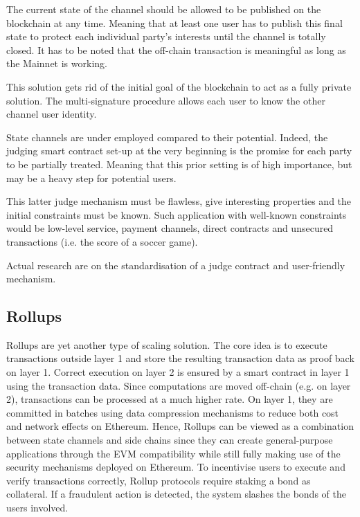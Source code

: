 The current state of the channel should be allowed to be published on the blockchain at any time. Meaning that at least one user has to publish this final state to protect each individual party's interests until the channel is totally closed. It has to be noted that the off-chain transaction is meaningful as long as the Mainnet is working.

This solution gets rid of the initial goal of the blockchain to act as a fully private solution. The multi-signature procedure allows each user to know the other channel user identity.


State channels are under employed compared to their potential. Indeed, the judging smart contract set-up at the very beginning is the promise for each party to be partially treated. Meaning that this prior setting is of high importance, but may be a heavy step for potential users.

This latter judge mechanism must be flawless, give interesting properties and the initial constraints must be known. Such application with well-known constraints would be low-level service, payment channels, direct contracts and unsecured transactions (i.e. the score of a soccer game). 

Actual research are on the standardisation of a judge contract and user-friendly mechanism.


\subsection{Rollups}

Rollups are yet another type of scaling solution. The core idea is to execute transactions outside layer 1 and store the resulting transaction data as proof back on layer 1. Correct execution on layer 2 is ensured by a smart contract in layer 1 using the transaction data. Since computations are moved off-chain (e.g. on layer 2), transactions can be processed at a much higher rate. On layer 1, they are committed in batches using data compression mechanisms to reduce both cost and network effects on Ethereum. Hence, Rollups can be viewed as a combination between state channels and side chains since they can create general-purpose applications through the EVM compatibility while still fully making use of the security mechanisms deployed on Ethereum. To incentivise users to execute and verify transactions correctly, Rollup protocols require staking a bond as collateral. If a fraudulent action is detected, the system slashes the bonds of the users involved. 

